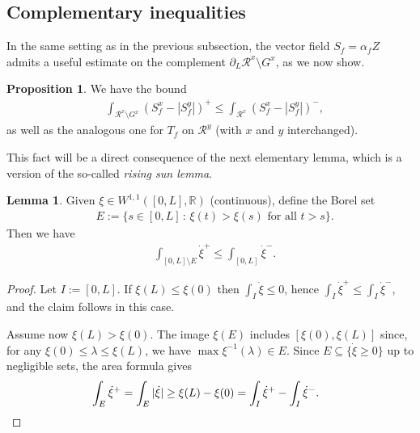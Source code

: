\documentclass[11pt,a4paper]{amsart}
\newcommand{\R}{\mathbb{R}}
\newcommand{\de}{\partial}
\theoremstyle{definition}
\newtheorem{lemmaen}[definition]{Lemma}
\newtheorem{proposition}[definition]{Proposition}
\begin{document}
\subsection{Complementary inequalities}
In the same setting as in the previous subsection,
the vector field $S_f=\alpha_f Z$ admits a useful estimate on the complement $\de_L\mathcal{R}^x\setminus G^x$,
as we now show.

\begin{proposition}\label{complement}
	We have the bound
	\begin{align*}
		&\int_{\mathcal{R}^x\setminus G^x}(S_f^x-|S_f^y|)^+
		\le\int_{\mathcal{R}^x}(S_f^x-|S_f^y|)^-,
	\end{align*}
	as well as the analogous one for $T_f$ on $\mathcal{R}^y$ (with $x$ and $y$ interchanged).
\end{proposition}

This fact will be a direct consequence of the next elementary lemma, which is a version of the so-called \emph{rising sun lemma}.

\begin{lemmaen}\label{sunrise}
	Given $\xi\in W^{1,1}([0,L],\R)$ (continuous), define the Borel set
	\begin{align*}
		&E:=\{s\in [0,L]\,:\,\xi(t)>\xi(s)\text{ for all }t>s\}.
	\end{align*}
	Then we have
	\begin{align*}
		&\int_{[0,L]\setminus E}\dot\xi^+
		\le\int_{[0,L]}\dot\xi^-.
	\end{align*}
\end{lemmaen}

\begin{proof}
	Let $I:=[0,L]$. If $\xi(L)\le\xi(0)$ then $\int_I\dot\xi\le 0$, hence $\int_I\dot\xi^+\le\int_I\dot\xi^-$, and the claim follows in this case.
	
	Assume now $\xi(L)>\xi(0)$.
	The image $\xi(E)$ includes $[\xi(0),\xi(L)]$ since, for any $\xi(0)\le\lambda\le\xi(L)$, we have $\max\xi^{-1}(\lambda)\in E$.
	Since $E\subseteq\{\dot\xi\ge 0\}$ up to negligible sets, the area formula gives
	\begin{align*}
		&\int_E\dot\xi^+
		=\int_E|\dot\xi|
		\ge\xi(L)-\xi(0)
		=\int_I\dot\xi^+ - \int_I\dot\xi^-. \qedhere
	\end{align*}
\end{proof}
\end{document}
